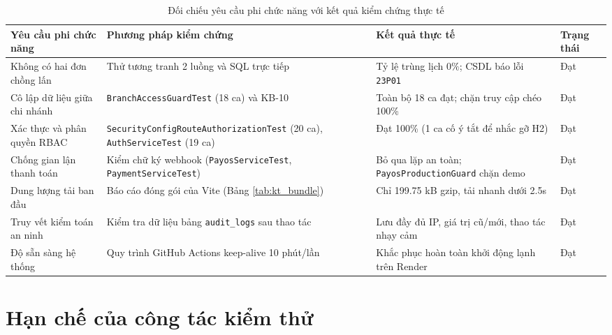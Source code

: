 \begin{table}[H]
\centering
\caption{Đối chiếu yêu cầu phi chức năng với kết quả kiểm chứng thực tế}
\label{tab:kt_nfr}
\footnotesize
\renewcommand{\arraystretch}{1.2}
\begin{tabular}{|p{3.4cm}|p{4.8cm}|p{4.2cm}|p{1.4cm}|}
\hline
\textbf{Yêu cầu phi chức năng} & \textbf{Phương pháp kiểm chứng} & \textbf{Kết quả thực tế} & \textbf{Trạng thái} \\
\hline
Không có hai đơn chồng lấn & Thử tương tranh 2 luồng và SQL trực tiếp & Tỷ lệ trùng lịch $0\%$; CSDL báo lỗi \texttt{23P01} & Đạt \\
\hline
Cô lập dữ liệu giữa chi nhánh & \texttt{BranchAccessGuardTest} (18 ca) và KB-10 & Toàn bộ 18 ca đạt; chặn truy cập chéo 100\% & Đạt \\
\hline
Xác thực và phân quyền RBAC & \texttt{SecurityConfigRouteAuthorizationTest} (20 ca), \texttt{AuthServiceTest} (19 ca) & Đạt 100\% (1 ca cố ý tắt để nhắc gỡ H2) & Đạt \\
\hline
Chống gian lận thanh toán & Kiểm chữ ký webhook (\texttt{PayosServiceTest}, \texttt{PaymentServiceTest}) & Bỏ qua lặp an toàn; \texttt{PayosProductionGuard} chặn demo & Đạt \\
\hline
Dung lượng tải ban đầu & Báo cáo đóng gói của Vite (Bảng \ref{tab:kt_bundle}) & Chỉ 199.75 kB gzip, tải nhanh dưới 2.5s & Đạt \\
\hline
Truy vết kiểm toán an ninh & Kiểm tra dữ liệu bảng \texttt{audit\_logs} sau thao tác & Lưu đầy đủ IP, giá trị cũ/mới, thao tác nhạy cảm & Đạt \\
\hline
Độ sẵn sàng hệ thống & Quy trình GitHub Actions keep-alive 10 phút/lần & Khắc phục hoàn toàn khởi động lạnh trên Render & Đạt \\
\hline
\end{tabular}
\end{table}

\section{Hạn chế của công tác kiểm thử}
\label{sec:kt_hanche}

